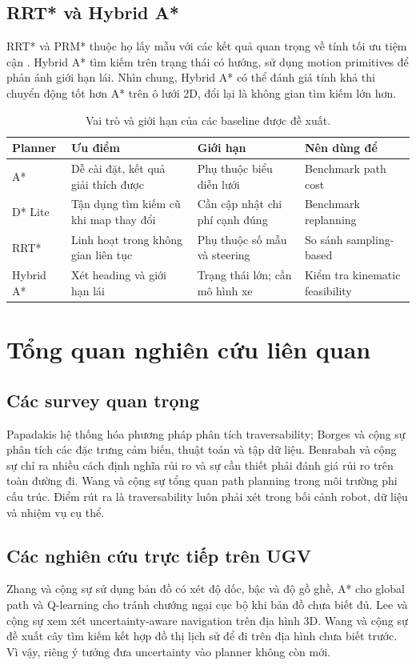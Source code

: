 \documentclass[11pt,a4paper]{article}
\begin{document}
\subsection{RRT* và Hybrid A*}
RRT* và PRM* thuộc họ lấy mẫu với các kết quả quan trọng
về tính tối ưu tiệm cận \cite{karaman2011optimal}.
Hybrid A* tìm kiếm trên trạng thái có hướng,
sử dụng motion primitives để phản ánh giới hạn lái.
Nhìn chung, Hybrid A* có thể đánh giá tính khả thi chuyển động
tốt hơn A* trên ô lưới 2D, đổi lại là không gian tìm kiếm lớn hơn.

\begin{table}[htbp]
\centering\small
\caption{Vai trò và giới hạn của các baseline được đề xuất.}
\begin{tabularx}{\textwidth}{@{}p{2.0cm}YYY@{}}
\toprule
Planner & Ưu điểm & Giới hạn & Nên dùng để \\
\midrule
A* & Dễ cài đặt, kết quả giải thích được & Phụ thuộc biểu diễn lưới & Benchmark path cost \\
D* Lite & Tận dụng tìm kiếm cũ khi map thay đổi & Cần cập nhật chi phí cạnh đúng & Benchmark replanning \\
RRT* & Linh hoạt trong không gian liên tục & Phụ thuộc số mẫu và steering & So sánh sampling-based \\
Hybrid A* & Xét heading và giới hạn lái & Trạng thái lớn; cần mô hình xe & Kiểm tra kinematic feasibility \\
\bottomrule
\end{tabularx}
\end{table}

\section{Tổng quan nghiên cứu liên quan}
\subsection{Các survey quan trọng}
Papadakis \cite{papadakis2013terrain} hệ thống hóa phương pháp
phân tích traversability; Borges và cộng sự \cite{borges2022survey}
phân tích các đặc trưng cảm biến, thuật toán và tập dữ liệu.
Benrabah và cộng sự \cite{benrabah2024risk} chỉ ra nhiều cách
định nghĩa rủi ro và sự cần thiết phải đánh giá rủi ro trên
toàn đường đi. Wang và cộng sự \cite{wang2024survey}
tổng quan path planning trong môi trường phi cấu trúc.
Điểm rút ra là traversability luôn phải xét trong bối cảnh
robot, dữ liệu và nhiệm vụ cụ thể.

\subsection{Các nghiên cứu trực tiếp trên UGV}
Zhang và cộng sự \cite{zhang2022wheeled} sử dụng bản đồ có xét
độ dốc, bậc và độ gồ ghề, A* cho global path và Q-learning
cho tránh chướng ngại cục bộ khi bản đồ chưa biết đủ.
Lee và cộng sự \cite{lee2023uncertainty} xem xét uncertainty-aware
navigation trên địa hình 3D. Wang và cộng sự \cite{wang2024history}
đề xuất cây tìm kiếm kết hợp đồ thị lịch sử để đi trên địa hình
chưa biết trước. Vì vậy, riêng ý tưởng đưa uncertainty
vào planner không còn mới.
\end{document}

